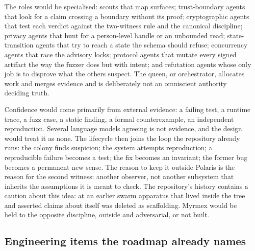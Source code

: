 
The roles would be specialised: scouts that map surfaces; trust-boundary agents that look for a
claim crossing a boundary without its proof; cryptographic agents that test each verdict against
the two-witness rule and the canonical discipline; privacy agents that hunt for a person-level
handle or an unbounded read; state-transition agents that try to reach a state the schema should
refuse; concurrency agents that race the advisory locks; protocol agents that mutate every signed
artifact the way the fuzzer does but with intent; and refutation agents whose only job is to
disprove what the others suspect. The queen, or orchestrator, allocates work and merges evidence
and is deliberately not an omniscient authority deciding truth.

Confidence would come primarily from external evidence: a failing test, a runtime trace, a fuzz
case, a static finding, a formal counterexample, an independent reproduction. Several language
models agreeing is not evidence, and the design would treat it as none. The lifecycle then joins the
loop the repository already runs: the colony finds suspicion; the system attempts reproduction; a
reproducible failure becomes a test; the fix becomes an invariant; the former bug becomes a permanent
new sense. The reason to keep it outside Polaris is the reason for the second witness: another
observer, not another subsystem that inherits the assumptions it is meant to check. The repository's
history contains a caution about this idea: at  an earlier swarm apparatus that lived
inside the tree and asserted claims about itself was deleted as scaffolding. Myrmex would be held to
the opposite discipline, outside and adversarial, or not built.

\subsection{Engineering items the roadmap already names}

